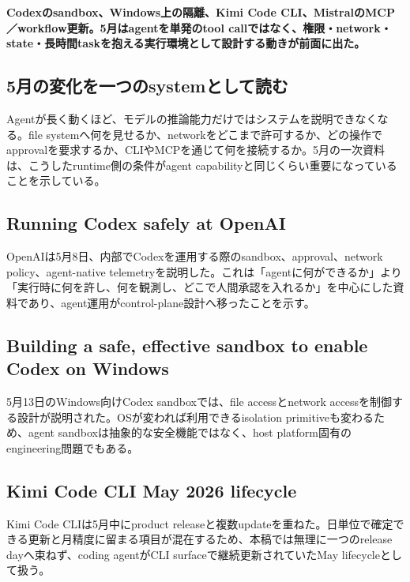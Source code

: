 \noindent\textbf{Codexのsandbox、Windows上の隔離、Kimi Code CLI、MistralのMCP／workflow更新。5月はagentを単発のtool callではなく、権限・network・state・長時間taskを抱える実行環境として設計する動きが前面に出た。}\autocite{src-4a3442a5ca8c,src-66be12207714,src-9191d43918fc,src-ac04c00cf21f,src-d8b7c1c36830}

\subsection{5月の変化を一つのsystemとして読む}

Agentが長く動くほど、モデルの推論能力だけではシステムを説明できなくなる。file systemへ何を見せるか、networkをどこまで許可するか、どの操作でapprovalを要求するか、CLIやMCPを通じて何を接続するか。5月の一次資料は、こうしたruntime側の条件がagent capabilityと同じくらい重要になっていることを示している。\autocite{src-4a3442a5ca8c,src-66be12207714,src-9191d43918fc,src-ac04c00cf21f,src-d8b7c1c36830}


\subsection{Running Codex safely at OpenAI}

OpenAIは5月8日、内部でCodexを運用する際のsandbox、approval、network policy、agent-native telemetryを説明した。これは「agentに何ができるか」より「実行時に何を許し、何を観測し、どこで人間承認を入れるか」を中心にした資料であり、agent運用がcontrol-plane設計へ移ったことを示す。\autocite{src-66be12207714}


\subsection{Building a safe, effective sandbox to enable Codex on Windows}

5月13日のWindows向けCodex sandboxでは、file accessとnetwork accessを制御する設計が説明された。OSが変われば利用できるisolation primitiveも変わるため、agent sandboxは抽象的な安全機能ではなく、host platform固有のengineering問題でもある。\autocite{src-4a3442a5ca8c}


\subsection{Kimi Code CLI May 2026 lifecycle}

Kimi Code CLIは5月中にproduct releaseと複数updateを重ねた。日単位で確定できる更新と月精度に留まる項目が混在するため、本稿では無理に一つのrelease dayへ束ねず、coding agentがCLI surfaceで継続更新されていたMay lifecycleとして扱う。\autocite{src-9191d43918fc}


